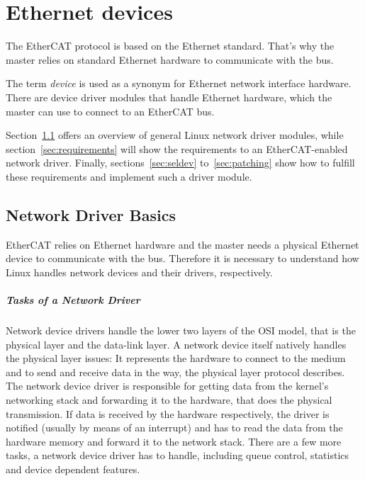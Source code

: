 \documentclass[a4paper,12pt,BCOR6mm,bibtotoc,idxtotoc]{scrbook}
\begin{document}

\chapter{Ethernet devices}
\label{sec:devices}

The EtherCAT protocol is based on the Ethernet standard. That's why the master
relies on standard Ethernet hardware to communicate with the bus.

The term \textit{device} is used as a synonym for Ethernet network interface
hardware. There are device driver modules that handle Ethernet hardware, which
the master can use to connect to an EtherCAT bus.

Section~\ref{sec:networkdrivers} offers an overview of general Linux
network driver modules, while section~\ref{sec:requirements} will show
the requirements to an EtherCAT-enabled network driver. Finally,
sections~\ref{sec:seldev} to~\ref{sec:patching} show how to fulfill
these requirements and implement such a driver module.


\section{Network Driver Basics}
\label{sec:networkdrivers}

EtherCAT relies on Ethernet hardware and the master needs a physical
Ethernet device to communicate with the bus. Therefore it is necessary
to understand how Linux handles network devices and their drivers,
respectively.

\paragraph{Tasks of a Network Driver}

Network device drivers handle the lower two layers of the OSI model,
that is the physical layer and the data-link layer. A network device
itself natively handles the physical layer issues: It represents the
hardware to connect to the medium and to send and receive data in the
way, the physical layer protocol describes. The network device driver
is responsible for getting data from the kernel's networking stack and
forwarding it to the hardware, that does the physical transmission.
If data is received by the hardware respectively, the driver is
notified (usually by means of an interrupt) and has to read the data
from the hardware memory and forward it to the network stack. There
are a few more tasks, a network device driver has to handle, including
queue control, statistics and device dependent features.
\end{document}
